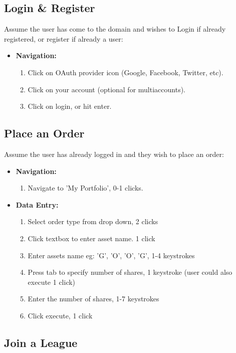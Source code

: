 \subsection{Login \& Register}

Assume the user has come to the domain and wishes to Login if already registered, or
register if already a user:\\
\begin{itemize}
\item \textbf{Navigation: }
\begin{enumerate}
\item Click on OAuth provider icon (Google, Facebook, Twitter, etc).
\item Click on your account (optional for multiaccounts).
\item Click on login, or hit enter.
\end{enumerate}
\end{itemize}

\subsection{Place an Order}

Assume the user has already logged in and they wish to place an order:\\

\begin{itemize}
\item \textbf{Navigation: }
\begin{enumerate}
\item Navigate to 'My Portfolio', 0-1 clicks.

\end{enumerate}
\item \textbf{Data Entry: }
\begin{enumerate}
\item Select order type from drop down, 2 clicks
\item Click textbox to enter asset name. 1 click
\item Enter assets name eg: 'G', 'O', 'O', 'G', 1-4 keystrokes
\item Press tab to specify number of shares, 1 keystroke (user could also execute 1 click)
\item Enter the number of shares, 1-7 keystrokes
\item Click execute, 1 click
\end{enumerate}
\end{itemize}

\subsection{Join a League}

